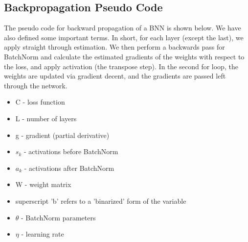 

\newpage

\subsection{Backpropagation Pseudo Code}

The pseudo code for backward propagation of a BNN is shown below. We have also defined some important terms. In short, for each layer (except the last), we apply straight through estimation. We then perform a backwards pass for BatchNorm and calculate the estimated gradients of the weights with respect to the loss, and apply activation (the transpose step). In the second for loop, the weights are updated via gradient decent, and the gradients are passed left through the network.



\begin{itemize}
    \item C - loss function
    \item L - number of layers
    \item g - gradient (partial derivative)
    \item $s_k$ - activations before BatchNorm
    \item $a_k$ - activations after BatchNorm
    \item W - weight matrix
    \item superscript 'b' refers to a 'binarized' form of the variable
    \item $\theta$ - BatchNorm parameters
    \item $\eta$ - learning rate
\end{itemize}

